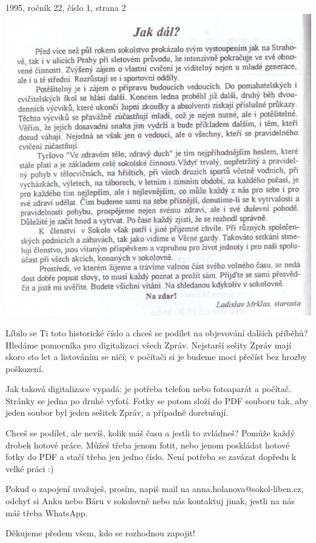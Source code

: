 \documentclass[11pt]{article}
\begin{document}
1995, ročník 22, číslo 1, strana 2 \\
\includegraphics[width=\imagewidth]{original/1995/Skener_20250320 (13).jpg}

\clearpage


Líbilo se Ti toto historické číslo a chceš se podílet na objevování
dalších příběhů? Hledáme pomocníka pro digitalizaci všech Zpráv.
Nejstarší sešity Zpráv mají skoro sto let a listováním se ničí; v
počítači si je budeme moci přečíst bez hrozby poškození.

Jak taková digitalizace vypadá: je potřeba telefon nebo fotoaparát a
počítač. Stránky se jedna po druhé vyfotí. Fotky se potom složí do PDF
souboru tak, aby jeden soubor byl jeden sešitek Zpráv, a případně
doretušují.

Chceš se podílet, ale nevíš, kolik máš času a jestli to zvládneš? Pomůže
každý drobek hotové práce. Můžeš třeba jenom fotit, nebo jenom poskládat
hotové fotky do PDF a stačí třeba jen jedno číslo. Není potřeba se
zavázat dopředu k velké práci :)

Pokud o zapojení uvažuješ, prosím, napiš mail na anna.holanova@sokol-liben.cz,
odchyť si Anku nebo Báru v sokolovně nebo nás kontaktuj jinak, jestli na
nás máš třeba WhatsApp.

Děkujeme předem všem, kdo se rozhodnou zapojit!
\vspace*{\baselineskip}
\end{document}
